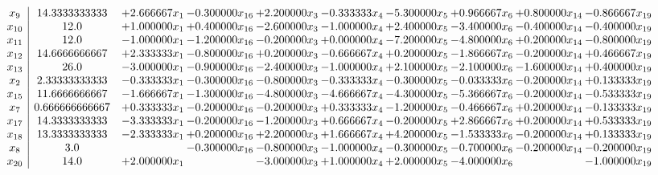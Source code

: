 \documentclass[10pt]{article}
\begin{document}
 \[\begin{array}{c| c c@{\hskip 2pt} c@{\hskip 2pt} c@{\hskip 2pt} c@{\hskip 2pt} c@{\hskip 2pt} c@{\hskip 2pt} c@{\hskip 2pt} c@{\hskip 2pt} }
 x_{9}   &  14.3333333333 & + 2.666667 x_{1} & -0.300000 x_{16} & + 2.200000 x_{3} & -0.333333 x_{4} & -5.300000 x_{5} & + 0.966667 x_{6} & + 0.800000 x_{14} & -0.866667 x_{19}\\
 x_{10}   &  12.0 & + 1.000000 x_{1} & + 0.400000 x_{16} & -2.600000 x_{3} & -1.000000 x_{4} & + 2.400000 x_{5} & -3.400000 x_{6} & -0.400000 x_{14} & -0.400000 x_{19}\\
 x_{11}   &  12.0 & -1.000000 x_{1} & -1.200000 x_{16} & -0.200000 x_{3} & + 0.000000 x_{4} & -7.200000 x_{5} & -4.800000 x_{6} & + 0.200000 x_{14} & -0.800000 x_{19}\\
 x_{12}   &  14.6666666667 & + 2.333333 x_{1} & -0.800000 x_{16} & + 0.200000 x_{3} & -0.666667 x_{4} & + 0.200000 x_{5} & -1.866667 x_{6} & -0.200000 x_{14} & + 0.466667 x_{19}\\
 x_{13}   &  26.0 & -3.000000 x_{1} & -0.900000 x_{16} & -2.400000 x_{3} & -1.000000 x_{4} & + 2.100000 x_{5} & -2.100000 x_{6} & -1.600000 x_{14} & + 0.400000 x_{19}\\
 x_{2}   &  2.33333333333 & -0.333333 x_{1} & -0.300000 x_{16} & -0.800000 x_{3} & -0.333333 x_{4} & -0.300000 x_{5} & -0.033333 x_{6} & -0.200000 x_{14} & + 0.133333 x_{19}\\
 x_{15}   &  11.6666666667 & -1.666667 x_{1} & -1.300000 x_{16} & -4.800000 x_{3} & -4.666667 x_{4} & -4.300000 x_{5} & -5.366667 x_{6} & -0.200000 x_{14} & -0.533333 x_{19}\\
 x_{7}   &  0.666666666667 & + 0.333333 x_{1} & -0.200000 x_{16} & -0.200000 x_{3} & + 0.333333 x_{4} & -1.200000 x_{5} & -0.466667 x_{6} & + 0.200000 x_{14} & -0.133333 x_{19}\\
 x_{17}   &  14.3333333333 & -3.333333 x_{1} & -0.200000 x_{16} & -1.200000 x_{3} & + 0.666667 x_{4} & -0.200000 x_{5} & + 2.866667 x_{6} & + 0.200000 x_{14} & + 0.533333 x_{19}\\
 x_{18}   &  13.3333333333 & -2.333333 x_{1} & + 0.200000 x_{16} & + 2.200000 x_{3} & + 1.666667 x_{4} & + 4.200000 x_{5} & -1.533333 x_{6} & -0.200000 x_{14} & + 0.133333 x_{19}\\
 x_{8}   &  3.0  &   & -0.300000 x_{16} & -0.800000 x_{3} & -1.000000 x_{4} & -0.300000 x_{5} & -0.700000 x_{6} & -0.200000 x_{14} & -0.200000 x_{19}\\
 x_{20}   &  14.0 & + 2.000000 x_{1} &   & -3.000000 x_{3} & + 1.000000 x_{4} & + 2.000000 x_{5} & -4.000000 x_{6} &   & -1.000000 x_{19}\\

\end{array}\]
\end{document}
